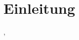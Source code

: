 \section{Einleitung}
\label{sec:einleitung}

\cite{Hunig.2006}, \cite{Hunig.2006}

\cite{Ignatowitz.2013}
\cite{https:www.industr.com.16.06.2021}

\cite{OnlinePortalfurprofessionellPflegende.06.03.2017}

\cite{legato_spritzenpumpe}